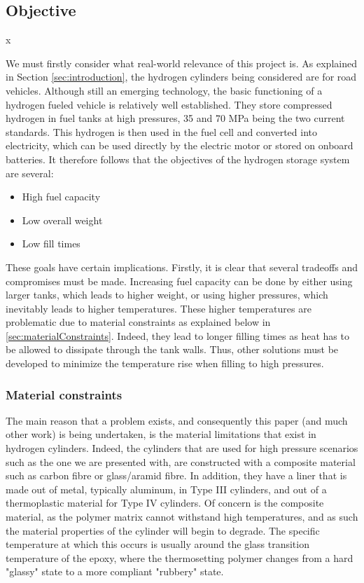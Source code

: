 


\subsection{Objective}x

We must firstly consider what real-world relevance of this project is. As explained in Section \ref{sec:introduction}, the hydrogen cylinders being considered are for road vehicles.  Although still an emerging technology, the basic functioning of a hydrogen fueled vehicle is relatively well established. They store compressed hydrogen in fuel tanks at high pressures, 35 and 70 MPa being the two current standards. This hydrogen is then used in the fuel cell and converted into electricity, which can be used directly by the electric motor or stored on onboard batteries. It therefore follows that the objectives of the hydrogen storage system are several:

\begin{itemize}
\item High fuel capacity
\item Low overall weight
\item Low fill times
\end{itemize}
These goals have certain implications. Firstly, it is clear that several tradeoffs and compromises must be made. Increasing fuel capacity can be done by either using larger tanks, which leads to higher weight, or using higher pressures, which inevitably leads to higher temperatures. These higher temperatures are problematic due to material constraints as explained below in \cref{sec:materialConstraints}. Indeed, they lead to longer filling times as heat has to be allowed to dissipate through the tank walls. Thus, other solutions must be developed to minimize the temperature rise when filling to high pressures.

\subsubsection{Material constraints} 
\label{sec:materialConstraints}
The main reason that a problem exists, and consequently this paper (and much other work) is being undertaken, is the material limitations that exist in hydrogen cylinders. Indeed, the cylinders that are used for high pressure scenarios such as the one we are presented with, are constructed with a composite material such as carbon fibre or glass/aramid fibre. In addition, they have a liner that is made out of metal, typically aluminum, in Type III cylinders, and out of a thermoplastic material for Type IV cylinders. Of concern is the composite material, as the polymer matrix cannot withstand high temperatures, and as such the material properties of the cylinder will begin to degrade. The specific temperature at which this occurs is usually around the glass transition temperature of the epoxy, where the thermosetting polymer changes from a hard "glassy" state to a more compliant "rubbery" state.  

